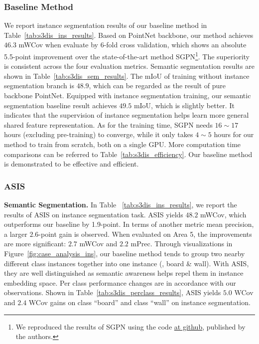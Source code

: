 \documentclass[10pt,twocolumn,letterpaper]{article}
\newcommand{\myparagraph}[1]{{\vspace{0.5em} \noindent \bf #1}}
\begin{document}
\subsubsection{Baseline Method}
We report instance segmentation results of our baseline method in Table~\ref{tab:s3dis_ins_results}.
Based on PointNet backbone, our method achieves $46.3$ mWCov when evaluate by 6-fold cross validation, which shows an absolute 5.5-point improvement over the state-of-the-art method SGPN\footnote{We reproduced the results of SGPN using the code \href{https://github.com/laughtervv/SGPN}{at github}, published by the authors.}.
The superiority is  consistent across the four evaluation metrics.
Semantic segmentation results are shown in Table~\ref{tab:s3dis_sem_results}.
The mIoU of training without instance segmentation branch is $48.9$, which can be regarded as the result of pure backbone PointNet. 
Equipped with instance segmentation training, our semantic segmentation baseline result achieves $49.5$ mIoU, which is slightly better.
It indicates that the supervision of instance segmentation helps learn more general shared feature representation.
As for the training time, SGPN needs $16\sim17$ hours (excluding pre-training) to converge, while it only takes $4\sim5$ hours for our method to train from scratch, both on a single GPU.
More computation time comparisons can be referred to Table~\ref{tab:s3dis_efficiency}.
Our baseline method is demonstrated to be effective and efficient.

\subsubsection{ASIS}
\myparagraph{Semantic Segmentation.}
In Table ~\ref{tab:s3dis_ins_results},  we report the results of ASIS on instance segmentation task.
ASIS yields $48.2$ mWCov, which outperforms our baseline by 1.9-point.
In terms of another metric mean precision, a larger $2.6$-point gain is observed.
When evaluated on Area 5, the improvements are more significant: $2.7$ mWCov and $2.2$ mPrec.
Through visualizations in Figure~\ref{fig:case_analysis_ins}, our baseline method tends to group two nearby different class instances together into one instance (\eg, board \& wall). With ASIS, they are well distinguished as semantic awareness helps repel them in instance embedding space.
Per class performance changes are in accordance with our observations.
Shown in Table~\ref{tab:s3dis_perclass_results}, ASIS yields $5.0$ WCov and $2.4$ WCov gains on class ``board'' and class ``wall'' on instance segmentation. 
\end{document}
